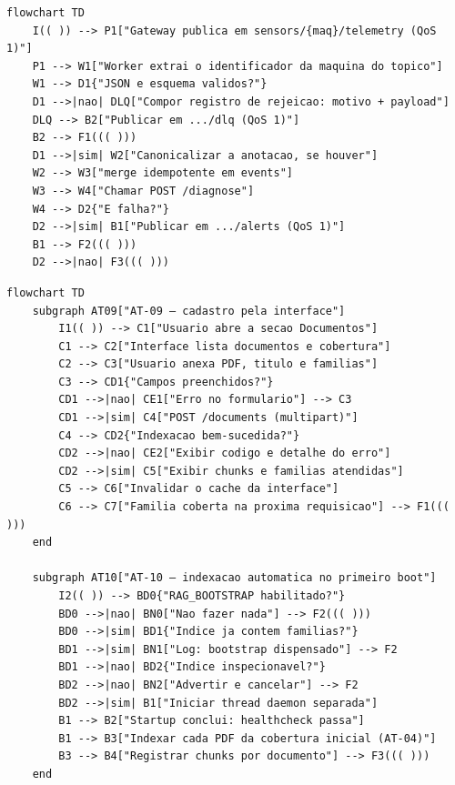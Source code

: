 \begin{lstlisting}[language=mermaid, caption={AT-08 --- ingestão de telemetria industrial}, label={lst:mmat08}]
flowchart TD
    I(( )) --> P1["Gateway publica em sensors/{maq}/telemetry (QoS 1)"]
    P1 --> W1["Worker extrai o identificador da maquina do topico"]
    W1 --> D1{"JSON e esquema validos?"}
    D1 -->|nao| DLQ["Compor registro de rejeicao: motivo + payload"]
    DLQ --> B2["Publicar em .../dlq (QoS 1)"]
    B2 --> F1((( )))
    D1 -->|sim| W2["Canonicalizar a anotacao, se houver"]
    W2 --> W3["merge idempotente em events"]
    W3 --> W4["Chamar POST /diagnose"]
    W4 --> D2{"E falha?"}
    D2 -->|sim| B1["Publicar em .../alerts (QoS 1)"]
    B1 --> F2((( )))
    D2 -->|nao| F3((( )))
\end{lstlisting}

\begin{lstlisting}[language=mermaid, caption={AT-09 e AT-10 --- cadastro de documento e indexação automática}, label={lst:mmat0910}]
flowchart TD
    subgraph AT09["AT-09 — cadastro pela interface"]
        I1(( )) --> C1["Usuario abre a secao Documentos"]
        C1 --> C2["Interface lista documentos e cobertura"]
        C2 --> C3["Usuario anexa PDF, titulo e familias"]
        C3 --> CD1{"Campos preenchidos?"}
        CD1 -->|nao| CE1["Erro no formulario"] --> C3
        CD1 -->|sim| C4["POST /documents (multipart)"]
        C4 --> CD2{"Indexacao bem-sucedida?"}
        CD2 -->|nao| CE2["Exibir codigo e detalhe do erro"]
        CD2 -->|sim| C5["Exibir chunks e familias atendidas"]
        C5 --> C6["Invalidar o cache da interface"]
        C6 --> C7["Familia coberta na proxima requisicao"] --> F1((( )))
    end

    subgraph AT10["AT-10 — indexacao automatica no primeiro boot"]
        I2(( )) --> BD0{"RAG_BOOTSTRAP habilitado?"}
        BD0 -->|nao| BN0["Nao fazer nada"] --> F2((( )))
        BD0 -->|sim| BD1{"Indice ja contem familias?"}
        BD1 -->|sim| BN1["Log: bootstrap dispensado"] --> F2
        BD1 -->|nao| BD2{"Indice inspecionavel?"}
        BD2 -->|nao| BN2["Advertir e cancelar"] --> F2
        BD2 -->|sim| B1["Iniciar thread daemon separada"]
        B1 --> B2["Startup conclui: healthcheck passa"]
        B1 --> B3["Indexar cada PDF da cobertura inicial (AT-04)"]
        B3 --> B4["Registrar chunks por documento"] --> F3((( )))
    end
\end{lstlisting}

